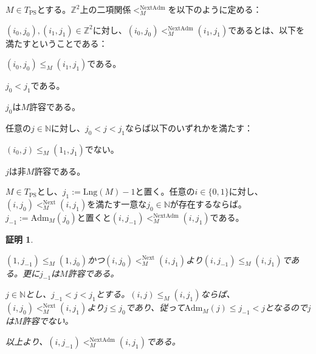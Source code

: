 \documentclass[dvipdfmx,uplatex]{jsarticle}
\theoremstyle{customnonumberbreakfortheorem}
\theoremstyle{customnonumberbreakforproof}
\newtheorem{hideableproof}{証明}
\begin{document}
\(M \in T_{\textrm{PS}}\)とする。\(\mathbb{Z}^2\)上の二項関係\(<_M^{\textrm{NextAdm}}\)を以下のように定める：
\begin{nenumerate}
	\item \((i_0,j_0), (i_1,j_1) \in \mathbb{Z}^2\)に対し、\((i_0,j_0)  <_M^{\textrm{NextAdm}} (i_1,j_1)\)であるとは、以下を満たすということである：
	\begin{nenumerate}
		\item \((i_0,j_0) \leq_M (i_1,j_1)\)である。
		\item \(j_0 < j_1\)である。
		\item \(j_0\)は\(M\)許容である。
		\item 任意の\(j \in \mathbb{N}\)に対し、\(j_0 < j < j_1\)ならば以下のいずれかを満たす：
		\begin{nenumerate}
			\item \((i_0,j) \leq_M (1_1,j_1)\)でない。
			\item \(j\)は非\(M\)許容である。
		\end{nenumerate}
	\end{nenumerate}
\end{nenumerate}

\begin{proposition}\label{AdmとNextAdmの関係}
	\(M \in T_{\textrm{PS}}\)とし、\(j_1 := \textrm{Lng}(M) - 1\)と置く。任意の\(i \in \{0,1\}\)に対し、\((i,j_0) <_M^{\textrm{Next}} (i,j_1)\)を満たす一意な\(j_0 \in \mathbb{N}\)が存在するならば。\(j_{-1} := \textrm{Adm}_M(j_0)\)と置くと\((i,j_{-1}) <_M^{\textrm{NextAdm}} (i,j_1)\)である。
\end{proposition}

\begin{hideableproof}
	\begin{indented}
		\item \((1,j_{-1}) \leq_M (1,j_0)\)かつ\((i,j_0) <_M^{\textrm{Next}} (i,j_1)\)より\((i,j_{-1}) \leq_M (i,j_1)\)である。更に\(j_{-1}\)は\(M\)許容である。
		\item \(j \in \mathbb{N}\)とし、\(j_{-1} < j < j_1\)とする。\((i,j) \leq_M (i,j_1)\)ならば、\((i,j_0) <_M^{\textrm{Next}} (i,j_1)\)より\(j \leq j_0\)であり、従って\(\textrm{Adm}_M(j) \leq j_{-1} < j\)となるので\(j\)は\(M\)許容でない。
		\item 以上より、\((i,j_{-1}) <_M^{\textrm{NextAdm}} (i,j_1)\)である。
	\end{indented}
\end{hideableproof}
\end{document}
